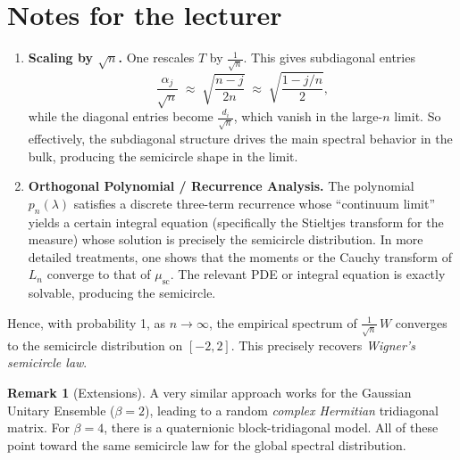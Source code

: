 \documentclass[letterpaper,11pt,oneside,reqno]{article}
\numberwithin{equation}{section}
\theoremstyle{definition}
\newtheorem{remark}[proposition]{Remark}
\newenvironment{lnotes}{\section*{Notes for the lecturer}}{}
\begin{document}
\begin{lnotes}
\begin{enumerate}[1.]
\item \textbf{Scaling by \(\sqrt{n}\).}
   One rescales \(T\) by \(\tfrac{1}{\sqrt{n}}\).  This gives subdiagonal entries
   \[
     \frac{\alpha_j}{\sqrt{n}}
     \;\approx\;
     \sqrt{\frac{n-j}{2n}}
     \;\approx\;
     \sqrt{\frac{1 - j/n}{2}},
   \]
   while the diagonal entries become \(\tfrac{d_i}{\sqrt{n}}\), which vanish in the large-\(n\) limit.  So effectively, the subdiagonal structure drives the main spectral behavior in the bulk, producing the semicircle shape in the limit.

\item \textbf{Orthogonal Polynomial / Recurrence Analysis.}
   The polynomial \(p_n(\lambda)\) satisfies a discrete three-term recurrence whose ``continuum limit'' yields a certain integral equation (specifically the Stieltjes transform for the measure) whose solution is precisely the semicircle distribution.  In more detailed treatments, one shows that the moments or the Cauchy transform of \(L_n\) converge to that of \(\mu_{\mathrm{sc}}\).  The relevant PDE or integral equation is exactly solvable, producing the semicircle.

\end{enumerate}

Hence, with probability 1, as \(n\to\infty\), the empirical spectrum of \(\tfrac{1}{\sqrt{n}}\,W\) converges to the semicircle distribution on \([-2,2]\).  This precisely recovers \emph{Wigner’s semicircle law}.

\begin{remark}[Extensions]
A very similar approach works for the Gaussian Unitary Ensemble (\(\beta=2\)), leading to a random \emph{complex Hermitian} tridiagonal matrix.  For \(\beta=4\), there is a quaternionic block-tridiagonal model.  All of these point toward the same semicircle law for the global spectral distribution.
\end{remark}


\end{lnotes}
\end{document}
